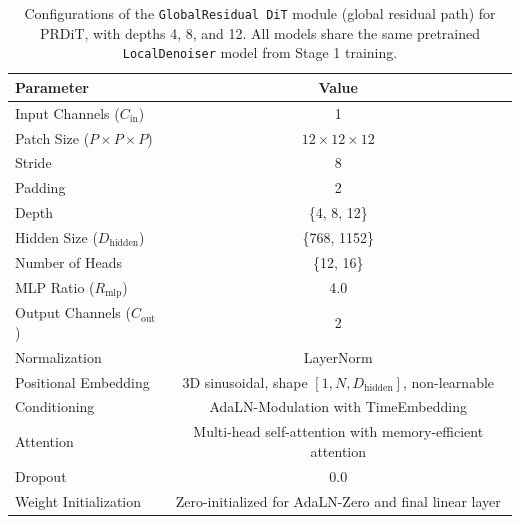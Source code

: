 \begin{table}[h]
    \centering
    \begin{tabular}{lc}
        \toprule
        Parameter & Value \\
        \midrule
        Input Channels ($C_{\text{in}}$) & 1 \\
        Patch Size ($P \times P \times P$) & $12 \times 12 \times 12$ \\
        Stride & 8 \\
        Padding & 2 \\
        Depth & \{4, 8, 12\} \\
        Hidden Size ($D_{\text{hidden}}$) & \{768, 1152\} \\
        Number of Heads & \{12, 16\} \\
        MLP Ratio ($R_{\text{mlp}}$) & 4.0 \\
        Output Channels ($C_{\text{out}}$) & 2 \\
        Normalization & LayerNorm \\
        Positional Embedding & 3D sinusoidal, shape $[1, N, D_{\text{hidden}}]$, non-learnable \\
        Conditioning & AdaLN-Modulation with TimeEmbedding \\
        Attention & Multi-head self-attention with memory-efficient attention \\
        Dropout & 0.0 \\
        Weight Initialization & Zero-initialized for AdaLN-Zero and final linear layer \\
        \bottomrule
    \end{tabular}
    \caption{Configurations of the \texttt{GlobalResidual DiT} module (global residual path) for PRDiT, with depths 4, 8, and 12. All models share the same pretrained \texttt{LocalDenoiser} model from Stage 1 training.}
\label{tab:fine_refiner_configs}
\end{table}
